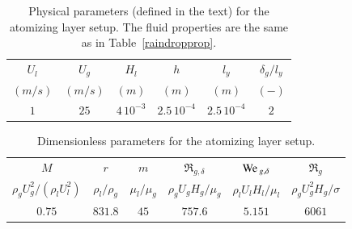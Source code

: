 \begin{table}
\begin{center}
\begin{tabular}{cccccc}
\hline
\hline
 $U_l$ & $U_g$ & $H_l$ & $h$ & $l_y$ & ${\delta_g}/{l_y}$ \\

 $(m/s)$ & $(m/s)$ & $(m)$ & $(m)$ & $(m)$ & $(-)$ \\
\hline
 $1$ & $25$ & $4\, 10^{-3}$ & $2.5\, 10^{-4}$ & $2.5\, 10^{-4}$ & $2$\\
\hline
\hline
\end{tabular}
\end{center}
\caption{Physical parameters (defined in the text) for the atomizing layer setup. The fluid 
properties are the same as in Table~\ref{raindropprop}.
}
\label{PhysicalParam}
\end{table}

\begin{table}
\begin{center}
\begin{tabular}{cccccc}
\hline
\hline
 $M$ & $r$ & $m$ & $\Re_{g,\delta}$ & ${\rm We}\,_{g,\delta}$  & $\Re_{g}$ \\
 $\rho_g U_g^2/\left(\rho_l U_l^2\right)$ & $\rho_l/\rho_g$ 
 & $\mu_l/\mu_g$ & $\rho_g U_g H_g/\mu_g$ & $\rho_l U_l H_l/\mu_l$ 
 & $\rho_g U_g^2 H_g/\sigma$ \\
\hline
 $0.75$ & $831.8$ & $45$ & $757.6$ & $5.151$ & $6061$  \\
\hline
\hline
\end{tabular}
\end{center}
\caption{Dimensionless parameters for the atomizing layer setup.}
\label{dimensionlessParam}
\end{table}
